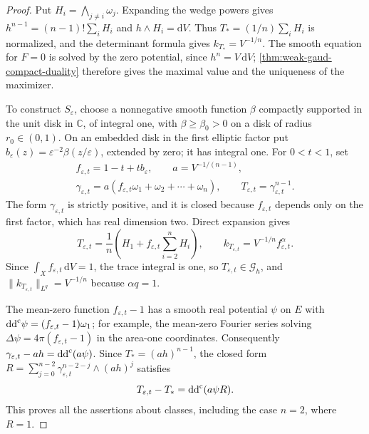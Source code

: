 \begin{proof}
Put $H_i=\bigwedge_{j\ne i}\omega_j$. Expanding the wedge powers gives
$h^{n-1}=(n-1)!\sum_iH_i$ and $h\wedge H_i=\mathrm{d}V$.
Thus $T_*=(1/n)\sum_iH_i$ is normalized, and the determinant formula gives $k_{T_*}=V^{-1/n}$. The smooth equation for $F=0$ is solved by the zero potential, since $h^n=V\,\mathrm{d}V$; \cref{thm:weak-gaud-compact-duality} therefore gives the maximal value and the uniqueness of the maximizer.

To construct $S_\varepsilon$, choose a nonnegative smooth function $\beta$ compactly supported in the unit disk in $\mathbb C$, of integral one, with $\beta\geq\beta_0>0$ on a disk of radius $r_0\in(0,1)$. On an embedded disk in the first elliptic factor put
$b_\varepsilon(z)=\varepsilon^{-2}\beta(z/\varepsilon)$, extended by zero; it has integral one. For $0<t<1$, set
\[
 \begin{gathered}
 f_{\varepsilon,t}=1-t+tb_\varepsilon,\qquad a=V^{-1/(n-1)},\\
 \gamma_{\varepsilon,t}=a(f_{\varepsilon,t}\omega_1+\omega_2+\cdots+\omega_n),
 \qquad T_{\varepsilon,t}=\gamma_{\varepsilon,t}^{n-1}.
 \end{gathered}
\]
The form $\gamma_{\varepsilon,t}$ is strictly positive, and it is closed because $f_{\varepsilon,t}$ depends only on the first factor, which has real dimension two. Direct expansion gives
\begin{equation}\label{eq:gaud-concentration-density}
 T_{\varepsilon,t}=\frac1n\left(H_1+f_{\varepsilon,t}\sum_{i=2}^nH_i\right),
 \qquad k_{T_{\varepsilon,t}}=V^{-1/n}f_{\varepsilon,t}^{\alpha}.
\end{equation}
Since $\int_Xf_{\varepsilon,t}\,\mathrm{d}V=1$, the trace integral is one, so $T_{\varepsilon,t}\in\mathscr G_h$, and
$\|k_{T_{\varepsilon,t}}\|_{L^q}=V^{-1/n}$ because $\alpha q=1$.

The mean-zero function $f_{\varepsilon,t}-1$ has a smooth real potential $\psi$ on $E$ with
$\mathrm{dd}^{\mathrm{c}}\psi=(f_{\varepsilon,t}-1)\omega_1$;
for example, the mean-zero Fourier series solving
$\Delta\psi=4\pi(f_{\varepsilon,t}-1)$ in the area-one coordinates.
Consequently $\gamma_{\varepsilon,t}-ah=\mathrm{dd}^{\mathrm{c}}(a\psi)$. Since $T_*=(ah)^{n-1}$, the closed form
$R=\sum_{j=0}^{n-2}\gamma_{\varepsilon,t}^{n-2-j}\wedge(ah)^j$ satisfies
\[
 T_{\varepsilon,t}-T_*=\mathrm{dd}^{\mathrm{c}}(a\psi R).
\]
This proves all the assertions about classes, including the case $n=2$, where $R=1$.


\end{proof}
